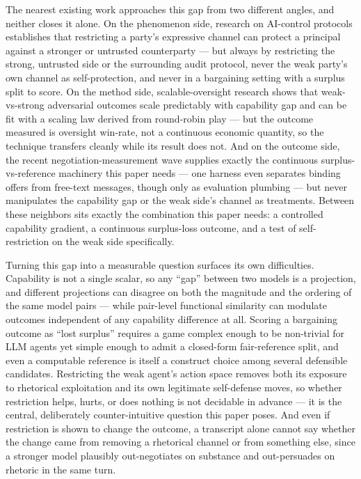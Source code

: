 \documentclass[11pt]{article}
\begin{document}
The nearest existing work approaches this gap from two different angles, and neither closes it alone. On the phenomenon side, research on AI-control protocols \citep{AIControl} establishes that restricting a party's expressive channel can protect a principal against a stronger or untrusted counterparty --- but always by restricting the strong, untrusted side or the surrounding audit protocol, never the weak party's own channel as self-protection, and never in a bargaining setting with a surplus split to score. On the method side, scalable-oversight research \citep{ScalingLawsOversight} shows that weak-vs-strong adversarial outcomes scale predictably with capability gap and can be fit with a scaling law derived from round-robin play --- but the outcome measured is oversight win-rate, not a continuous economic quantity, so the technique transfers cleanly while its result does not. And on the outcome side, the recent negotiation-measurement wave supplies exactly the continuous surplus-vs-reference machinery this paper needs \citep{TermsBench2605,BilateralTradeEnv2604} --- one harness even separates binding offers from free-text messages, though only as evaluation plumbing --- but never manipulates the capability gap or the weak side's channel as treatments. Between these neighbors sits exactly the combination this paper needs: a controlled capability gradient, a continuous surplus-loss outcome, and a test of self-restriction on the weak side specifically.

Turning this gap into a measurable question surfaces its own difficulties. Capability is not a single scalar, so any ``gap'' between two models is a projection, and different projections can disagree on both the magnitude and the ordering of the same model pairs --- while pair-level functional similarity can modulate outcomes independent of any capability difference at all. Scoring a bargaining outcome as ``lost surplus'' requires a game complex enough to be non-trivial for LLM agents yet simple enough to admit a closed-form fair-reference split, and even a computable reference is itself a construct choice among several defensible candidates. Restricting the weak agent's action space removes both its exposure to rhetorical exploitation and its own legitimate self-defense moves, so whether restriction helps, hurts, or does nothing is not decidable in advance --- it is the central, deliberately counter-intuitive question this paper poses. And even if restriction is shown to change the outcome, a transcript alone cannot say whether the change came from removing a rhetorical channel or from something else, since a stronger model plausibly out-negotiates on substance and out-persuades on rhetoric in the same turn.
\end{document}
